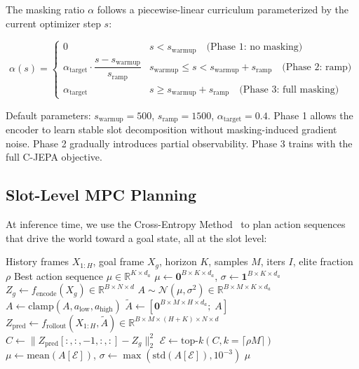 \documentclass[12pt]{article}
\begin{document}
The masking ratio $\alpha$ follows a piecewise-linear curriculum parameterized by the current optimizer step $s$:

\begin{equation}
\alpha(s) = \begin{cases}
0 & s < s_{\text{warmup}} \quad \text{(Phase 1: no masking)}\\[3pt]
\alpha_{\text{target}} \cdot \dfrac{s - s_{\text{warmup}}}{s_{\text{ramp}}} & s_{\text{warmup}} \leq s < s_{\text{warmup}} + s_{\text{ramp}} \quad \text{(Phase 2: ramp)}\\[6pt]
\alpha_{\text{target}} & s \geq s_{\text{warmup}} + s_{\text{ramp}} \quad \text{(Phase 3: full masking)}
\end{cases}
\end{equation}

Default parameters: $s_{\text{warmup}} = 500$, $s_{\text{ramp}} = 1500$, $\alpha_{\text{target}} = 0.4$. Phase 1 allows the encoder to learn stable slot decomposition without masking-induced gradient noise. Phase 2 gradually introduces partial observability. Phase 3 trains with the full C-JEPA objective.

\subsection{Slot-Level MPC Planning}

At inference time, we use the Cross-Entropy Method~\citep{rubinstein2004cem} to plan action sequences that drive the world toward a goal state, all at the slot level:

\begin{algorithm}[t]
\caption{Slot-Level CEM MPC}
\label{alg:cem}
\begin{algorithmic}[1]
\Require History frames $X_{1:H}$, goal frame $X_g$, horizon $K$, samples $M$, iters $I$, elite fraction $\rho$
\Ensure Best action sequence $\mu \in \mathbb{R}^{K \times d_a}$
\State $\mu \gets \bm{0}^{B \times K \times d_a}$, $\sigma \gets \bm{1}^{B \times K \times d_a}$
\State $Z_g \gets f_{\text{encode}}(X_g) \in \mathbb{R}^{B \times N \times d}$ 
    \State $A \sim \mathcal{N}(\mu, \sigma^2) \in \mathbb{R}^{B \times M \times K \times d_a}$ 
    \State $A \gets \text{clamp}(A, a_{\text{low}}, a_{\text{high}})$
    \State $\tilde{A} \gets [\bm{0}^{B \times M \times H \times d_a};\; A]$ 
    \State $Z_{\text{pred}} \gets f_{\text{rollout}}(X_{1:H}, \tilde{A}) \in \mathbb{R}^{B \times M \times (H+K) \times N \times d}$
    \State $C \gets \|Z_{\text{pred}}[:,:,-1,:,:] - Z_g\|_2^2$ 
    \State $\mathcal{E} \gets \text{top-}k(C, k = \lceil \rho M \rceil)$ 
    \State $\mu \gets \text{mean}(A[\mathcal{E}])$, $\sigma \gets \max(\text{std}(A[\mathcal{E}]), 10^{-3})$
\EndFor
\State \Return $\mu$
\end{algorithmic}
\end{algorithm}
\end{document}
